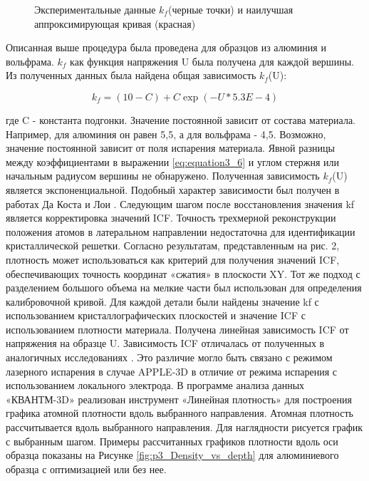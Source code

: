 \begin{figure}[htb]
	\caption{Экспериментальные данные $k_f$(черные точки) и наилучшая аппроксимирующая кривая (красная)}
	\label{fig:p3_kf_vs_voltage}
\end{figure} 

Описанная выше процедура была проведена для образцов из алюминия и вольфрама. $k_f$ как функция напряжения U была получена для каждой вершины. Из полученных данных была найдена общая зависимость $k_f$(U):

\begin{equation}
	\label{eq:equation3_n}
	k_f = (10 - C) + C\exp(- U * 5.3E-4)
\end{equation}

где C - константа подгонки. Значение постоянной зависит от состава материала. Например, для алюминия он равен 5,5, а для вольфрама - 4,5. Возможно, значение постоянной зависит от поля испарения материала. Явной разницы между коэффициентами в выражении \cref{eq:equation3_6} и углом стержня или начальным радиусом вершины не обнаружено. Полученная зависимость $k_f$(U) является экспоненциальной. Подобный характер зависимости был получен в работах Да Коста \cite{Hatzoglou19} и Лои \cite{Loi13}.
Следующим шагом после восстановления значения kf является корректировка значений ICF. Точность трехмерной реконструкции положения атомов в латеральном направлении недостаточна для идентификации кристаллической решетки. Согласно результатам, представленным на рис. 2, плотность может использоваться как критерий для получения значений ICF, обеспечивающих точность координат «сжатия» в плоскости XY. Тот же подход с разделением большого объема на мелкие части был использован для определения калибровочной кривой. Для каждой детали были найдены значение kf с использованием кристаллографических плоскостей и значение ICF с использованием плотности материала. Получена линейная зависимость ICF от напряжения на образце U. Зависимость ICF отличалась от полученных в аналогичных исследованиях \cite{Hatzoglou19, Gault11_Loi}. Это различие могло быть связано с режимом лазерного испарения в случае APPLE-3D в отличие от режима испарения с использованием локального электрода.
В программе анализа данных «КВАНТМ-3D» реализован инструмент «Линейная плотность» для построения графика атомной плотности вдоль выбранного направления. Атомная плотность рассчитывается вдоль выбранного направления. Для наглядности рисуется график с выбранным шагом. Примеры рассчитанных графиков плотности вдоль оси образца показаны на Рисунке \cref{fig:p3_Density_vs_depth} для алюминиевого образца с оптимизацией или без нее.

